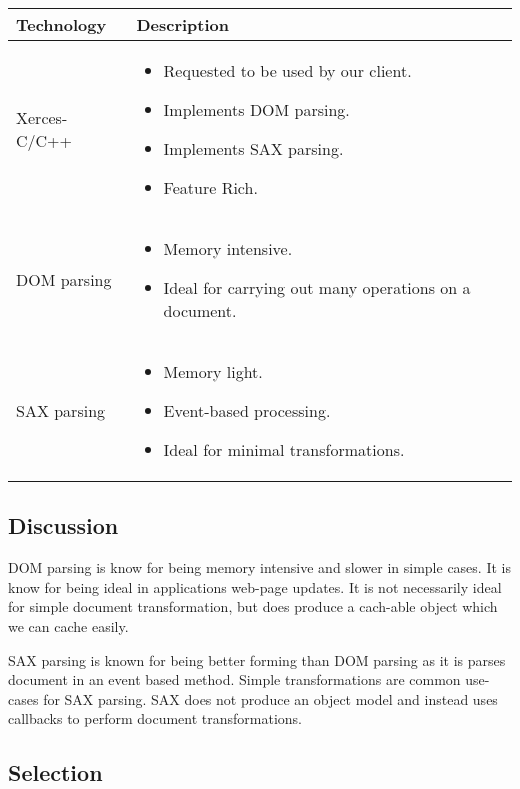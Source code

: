 \begin{center}
  \begin{tabular}{ | l | p{10cm} | }
    \hline
    Technology & Description  \\ \hline
    Xerces-C/C++ \cite{xerces} &
    \begin{itemize}
      \item Requested to be used by our client.
      \item Implements DOM parsing.
      \item Implements SAX parsing.
      \item Feature Rich.
    \end{itemize}\\ \hline
    DOM parsing \cite{dom-vs-sax} &
    \begin{itemize}
      \item Memory intensive.
      \item Ideal for carrying out many operations on a document.
    \end{itemize}\\ \hline
    SAX parsing \cite{dom-vs-sax} &
    \begin{itemize}
      \item Memory light.
      \item Event-based processing.
      \item Ideal for minimal transformations.
    \end{itemize}\\ \hline
  \end{tabular}
\end{center}

\subsection{Discussion}

DOM parsing is know for being memory intensive and slower in simple cases.
It is know for being ideal in applications web-page updates.
It is not necessarily ideal for simple document transformation, but does produce a cach-able object which we can cache easily.

SAX parsing is known for being better forming than DOM parsing as it is parses document in an event based method.
Simple transformations are common use-cases for SAX parsing.
SAX does not produce an object model and instead uses callbacks to perform document transformations.

\subsection{Selection}

